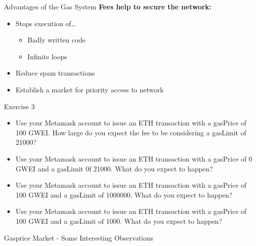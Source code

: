 \documentclass[]{beamer}
\begin{document}
\begin{frame}{Advantages of the Gas System}
	\textbf{Fees help to secure the network:}
	\begin{itemize}
		\item Stops execution of…
		\begin{itemize}
			\item Badly written code
			\item Infinite loops
		\end{itemize}
		\item Reduce spam transactions
		\item Establish a market for priority access to network
	\end{itemize}
	
\begin{block}{Exercise 3} %
\begin{itemize}
	\item Use your Metamask account to issue an ETH transaction with a gasPrice of 100 GWEI. How large do you expect the fee to be considering a gasLimit of 21000?
	\item Use your Metamask account to issue an ETH transaction with a gasPrice of 0 GWEI and a gasLimit 0f 21000. What do you expect to happen?
	\item Use your Metamask account to issue an ETH transaction with a gasPrice of 100 GWEI and a gasLimit of 1000000. What do you expect to happen?
	\item Use your Metamask account to issue an ETH transaction with a gasPrice of 100 GWEI and a gasLimit of 1000. What do you expect to happen?
\end{itemize}
\end{block}
\end{frame}

\begin{frame}{Gasprice Market - Some Interesting Observations}
\end{frame}
\end{document}
